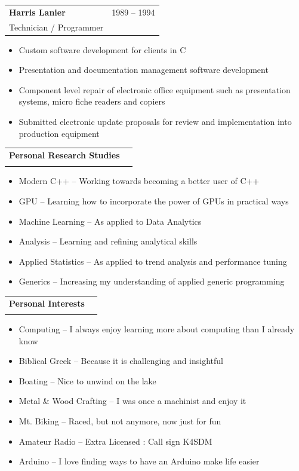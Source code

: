 \documentclass[10pt]{report}
\begin{document}
\noindent
\begin{tabular}{ L{.5\textwidth}  R{.4\textwidth} }
\textbf{\large Harris Lanier}  & 1989 -- 1994 \\
Technician / Programmer &
\end{tabular}

\begin{itemize}
\item Custom software development for clients in C
\item Presentation and documentation management software development
\item Component level repair of electronic office equipment such as presentation systems, micro fiche readers and copiers
\item Submitted electronic update proposals for review and implementation into production equipment
\end{itemize}
\bigskip
\bigskip


\noindent
\begin{tabular}{ L{.5\textwidth}  R{.4\textwidth} }
	\textbf{\large Personal Research Studies}  &  \\
	 &
\end{tabular}

\begin{itemize}
	\item Modern C++ -- Working towards becoming a better user of C++
	\item GPU -- Learning how to incorporate the power of GPUs in practical ways	
	\item Machine Learning -- As applied to Data Analytics
	\item Analysis -- Learning and refining analytical skills
	\item Applied Statistics -- As applied to trend analysis and performance tuning
	\item Generics -- Increasing my understanding of applied generic programming
\end{itemize}
\bigskip


\noindent
\begin{tabular}{ L{.5\textwidth}  R{.4\textwidth} }
	\textbf{\large Personal Interests}  &  \\
	&
\end{tabular}

\begin{itemize}
	\item Computing -- I always enjoy learning more about computing than I already know	
	\item Biblical Greek -- Because it is challenging and insightful
	\item Boating -- Nice to unwind on the lake
	\item Metal \& Wood Crafting -- I was once a machinist and enjoy it
	\item Mt. Biking -- Raced, but not anymore, now just for fun
	\item Amateur Radio -- Extra Licensed : Call sign K4SDM
	\item Arduino -- I love finding ways to have an Arduino make life easier
\end{itemize}
\bigskip
\end{document}
